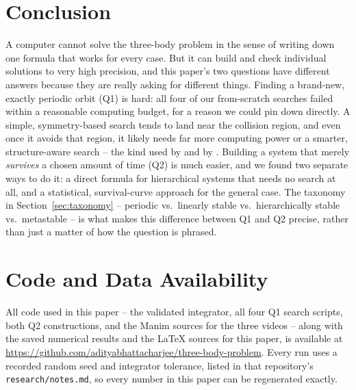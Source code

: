 \documentclass[11pt]{article}
\begin{document}
\section{Conclusion}

A computer cannot solve the three-body problem in the sense of writing
down one formula that works for every case. But it can build and check
individual solutions to very high precision, and this paper's two
questions have different answers because they are really asking for
different things. Finding a brand-new, exactly periodic orbit (Q1) is
hard: all four of our from-scratch searches failed within a reasonable
computing budget, for a reason we could pin down directly. A simple,
symmetry-based search tends to land near the collision region, and even
once it avoids that region, it likely needs far more computing power or a
smarter, structure-aware search -- the kind used by
\citet{SuvakovDmitrasinovic2013} and by \citet{LiLiao2017}. Building a
system that merely \emph{survives} a chosen amount of time (Q2) is much
easier, and we found two separate ways to do it: a direct formula for
hierarchical systems that needs no search at all, and a statistical,
survival-curve approach for the general case. The taxonomy in
Section~\ref{sec:taxonomy} -- periodic vs.\ linearly stable vs.\
hierarchically stable vs.\ metastable -- is what makes this difference
between Q1 and Q2 precise, rather than just a matter of how the question
is phrased.

\section*{Code and Data Availability}

All code used in this paper -- the validated integrator, all four Q1
search scripts, both Q2 constructions, and the Manim sources for the
three videos -- along with the saved numerical results and the
\LaTeX{} sources for this paper, is available at
\url{https://github.com/adityabhattacharjee/three-body-problem}.
Every run uses a recorded random seed and integrator tolerance, listed in
that repository's \texttt{research/notes.md}, so every number in this
paper can be regenerated exactly.



\end{document}
